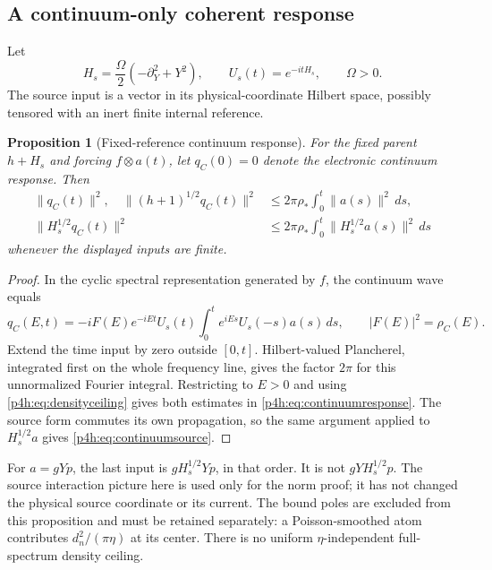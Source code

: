 \documentclass[11pt]{article}
\numberwithin{equation}{section}
\newtheorem{proposition}[theorem]{Proposition}
\theoremstyle{definition}
\theoremstyle{remark}
\begin{document}
\subsection{A continuum-only coherent response}

Let
\begin{equation}\label{p4h:eq:source}
 H_s=\frac{\Omega}{2}(-\partial_Y^2+Y^2),\qquad
 U_s(t)=e^{-itH_s},\qquad\Omega>0 .
\end{equation}
The source input is a vector in its physical-coordinate Hilbert
space, possibly tensored with an inert finite internal reference.

\begin{proposition}[Fixed-reference continuum response]
\label{p4h:prop:continuum}
For the fixed parent $h+H_s$ and forcing $f\otimes a(t)$,
let $q_C(0)=0$ denote the electronic continuum response. Then
\begin{align}
 \|q_C(t)\|^2,\quad\|(h+1)^{1/2}q_C(t)\|^2
 &\leq2\pi\rho_*\int_0^t\|a(s)\|^2\,ds,
 \label{p4h:eq:continuumresponse}\\
 \|H_s^{1/2}q_C(t)\|^2
 &\leq2\pi\rho_*\int_0^t\|H_s^{1/2}a(s)\|^2\,ds
 \label{p4h:eq:continuumsource}
\end{align}
whenever the displayed inputs are finite.
\end{proposition}
\begin{proof}
In the cyclic spectral representation generated by $f$, the
continuum wave equals
\[
 q_C(E,t)=-iF(E)e^{-iEt}U_s(t)
       \int_0^t e^{iEs}U_s(-s)a(s)\,ds,\qquad
                         |F(E)|^2=\rho_C(E).
\]
Extend the time input by zero outside $[0,t]$. Hilbert-valued
Plancherel, integrated first on the whole frequency line,
gives the factor $2\pi$ for this unnormalized Fourier integral.
Restricting to $E>0$ and using
\eqref{p4h:eq:densityceiling} gives both estimates in
\eqref{p4h:eq:continuumresponse}. The source form commutes its
own propagation, so the same argument applied to
$H_s^{1/2}a$ gives \eqref{p4h:eq:continuumsource}.
\end{proof}

For $a=gYp$, the last input is $gH_s^{1/2}Yp$, in that order.
It is not $gYH_s^{1/2}p$. The source interaction picture here
is used only for the norm proof; it has not changed the
physical source coordinate or its current. The bound poles
are excluded from this proposition and must be retained
separately: a Poisson-smoothed atom contributes
$d_n^2/(\pi\eta)$ at its center. There is no uniform
$\eta$-independent full-spectrum density ceiling.
\end{document}

